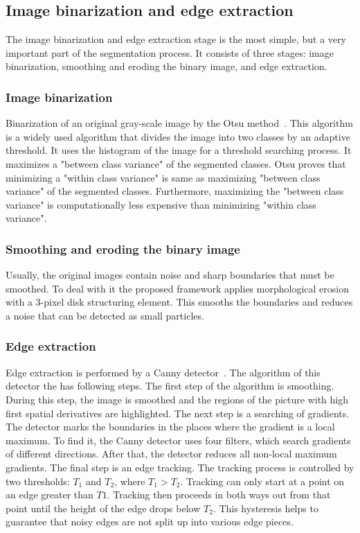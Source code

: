 \documentclass{lutmscthesis}[2010/09/22]
\begin{document}
\subsection{Image binarization and edge extraction}

The image binarization and edge extraction stage is the most simple, but a very important part of the segmentation process. It consists of three stages: image binarization, smoothing and eroding the binary image, and edge extraction.

\subsubsection{Image binarization}

Binarization of an original gray-scale image by the Otsu method~\cite{otsu}. This algorithm is a widely used algorithm that divides the image into two classes by an adaptive threshold. It uses the histogram of the image for a threshold searching process. It maximizes a "between class variance" of the segmented classes. Otsu proves that minimizing a "within class variance" is same as maximizing "between class variance" of the segmented classes. Furthermore, maximizing the "between class variance" is computationally less expensive than minimizing "within class variance".
   
\subsubsection{Smoothing and eroding the binary image}

Usually, the original images contain noise and sharp boundaries that must be smoothed. To deal with it the proposed framework applies morphological erosion~\cite{UECS} with a 3-pixel disk structuring element. This smooths the boundaries and reduces a noise that can be detected as small particles.
 
\subsubsection{Edge extraction}

Edge extraction is performed by a Canny detector~\cite{Canny}. The algorithm of this detector the has following steps. The first step of the algorithm is smoothing. During this step, the image is smoothed and the regions of the picture with high first spatial derivatives are highlighted. The next step is a searching of gradients. The detector marks the boundaries in the places where the gradient is a local maximum. To find it, the Canny detector uses four filters, which search gradients of different directions. After that, the detector reduces all non-local maximum gradients.
The final step is an edge tracking. The tracking process is controlled by two thresholds: $T_1$ and $T_2$, where $T_1 > T_2$. Tracking can only start at a point on an edge greater than $T1$. Tracking then proceeds in both ways out from that point until the height of the edge drops below $T_2$. This hysteresis helps to guarantee that noisy edges are not split up into various edge pieces.
\end{document}
